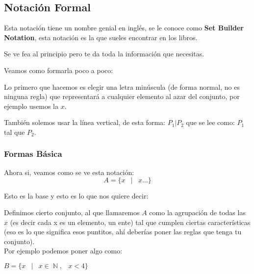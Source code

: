 \documentclass[12pt]{report}                                    %
\DeclareMathOperator \Space {\quad}                             %
\DeclareMathOperator \MiniSpace {\;}                            %
\newcommand \Such {\MiniSpace|\MiniSpace}                       %
\DeclareMathOperator \Naturals  {\mathbb{N}}                     %
\begin{document}
                \clearpage
                \subsection{Notación Formal} 

                    Esta notación tiene un nombre genial en inglés, se le conoce como \textbf{Set Builder Notation},
                    esta notación es la que sueles encontrar en los libros. 

                    Se ve fea al principio pero te da toda la información que necesitas.

                    Veamos como formarla poco a poco:

                    Lo primero que hacemos es elegir una letra minúscula (de forma normal, no es ninguna regla)
                    que representará a cualquier elemento al azar del conjunto, por ejemplo usemos la $x$.

                    También solemos usar la línea vertical, de esta forma: $P_1 | P_2$ que se lee como: 
                    $P_1$ tal que $P_2$.  

                    \subsubsection*{Formas Básica}

                        Ahora si, veamos como se ve esta notación:
                        \begin{equation}   
                            A = \{ x \Such x \dots \}
                        \end{equation}

                        Esto es la base y esto es lo que nos quiere decir:

                        Definimos cierto conjunto, al que llamaremos $A$ como la agrupación de todas las $x$
                        (es decir cada x es un elemento, un ente) tal que cumplen ciertas características
                        (eso es lo que significa esos puntitos, ahí deberías poner las reglas que tenga
                        tu conjunto). \\

                        Por ejemplo podemos poner algo como:

                        $B = \{ x \Such x \in \Naturals, \MiniSpace x < 4 \}$\\
\end{document}
